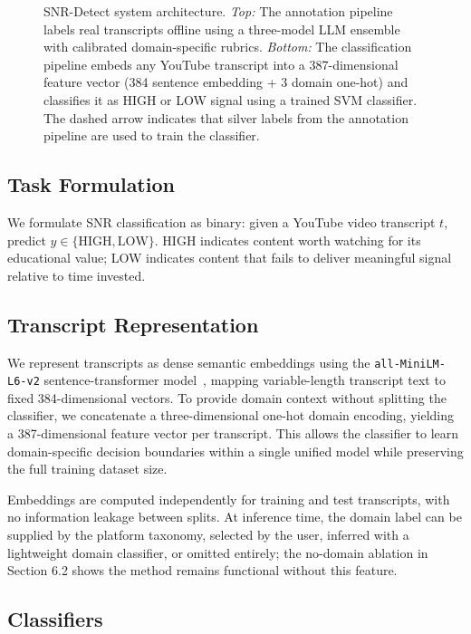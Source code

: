 \documentclass[11pt,a4paper]{article}
\begin{document}
\begin{figure}[ht]
\begin{tikzpicture}
\end{tikzpicture}
\caption{SNR-Detect system architecture. \textit{Top:} The annotation pipeline labels real
transcripts offline using a three-model LLM ensemble with calibrated domain-specific rubrics.
\textit{Bottom:} The classification pipeline embeds any YouTube transcript into a 387-dimensional
feature vector (384 sentence embedding + 3 domain one-hot) and classifies it as HIGH or LOW
signal using a trained SVM classifier. The dashed arrow indicates that silver labels from the
annotation pipeline are used to train the classifier.}
\label{fig:arch}
\end{figure}

\subsection{Task Formulation}

We formulate SNR classification as binary: given a YouTube video transcript $t$, predict
$y \in \{\text{HIGH}, \text{LOW}\}$. HIGH indicates content worth watching for its educational
value; LOW indicates content that fails to deliver meaningful signal relative to time invested.

\subsection{Transcript Representation}

We represent transcripts as dense semantic embeddings using the \texttt{all-MiniLM-L6-v2}
sentence-transformer model~\cite{reimers2019}, mapping variable-length transcript text to fixed
384-dimensional vectors. To provide domain context without splitting the classifier, we
concatenate a three-dimensional one-hot domain encoding, yielding a 387-dimensional feature
vector per transcript. This allows the classifier to learn domain-specific decision boundaries
within a single unified model while preserving the full training dataset size.

Embeddings are computed independently for training and test transcripts, with no information
leakage between splits. At inference time, the domain label can be supplied by the platform
taxonomy, selected by the user, inferred with a lightweight domain classifier, or omitted
entirely; the no-domain ablation in Section 6.2 shows the method remains functional without
this feature.

\subsection{Classifiers}
\end{document}
